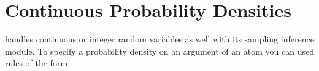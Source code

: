 \documentclass[letterpaper,10pt,english]{sphinxmanual}
\begin{document}
\section{Continuous Probability Densities}
\label{\detokenize{index:continuous-probability-densities}}
\sphinxAtStartPar
{} handles continuous or integer random variables as well with its sampling inference module.
To specify a probability density on an argument  of an atom  you can used rules of the form

\begin{sphinxVerbatim}[commandchars=\\\{\}]
 
\end{sphinxVerbatim}
\end{document}
